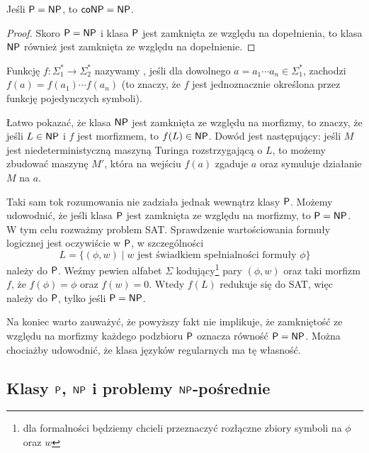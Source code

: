 \begin{theorem}
    Jeśli $\textsf{P} = \textsf{NP}$, to $\textsf{coNP} = \textsf{NP}$.
\end{theorem}
\begin{proof}
    Skoro $\textsf{P} = \textsf{NP}$ i klasa $\textsf{P}$ jest zamknięta ze względu na dopełnienia, to klasa $\textsf{NP}$ również jest zamknięta ze względu na dopełnienie.
\end{proof}

\begin{remark}
    Funkcję $f : \Sigma_1^* \to \Sigma_2^*$ nazywamy , jeśli dla dowolnego $a = a_1 \cdots a_n \in \Sigma_1^*$, zachodzi $f(a) = f(a_1) \cdots f(a_n)$ (to znaczy, że $f$ jest jednoznacznie określona przez funkcję pojedynczych symboli).

    Łatwo pokazać, że klasa $\textsf{NP}$ jest zamknięta ze względu na morfizmy, to znaczy, że jeśli $L \in \textsf{NP}$ i $f$ jest morfizmem, to $f(L) \in \textsf{NP}$. Dowód jest następujący: jeśli $M$ jest niedeterministyczną maszyną Turinga rozstrzygającą o $L$, to możemy zbudować maszynę $M'$, która na wejściu $f(a)$ zgaduje $a$ oraz symuluje działanie $M$ na $a$.

    Taki sam tok rozumowania nie zadziała jednak wewnątrz klasy $\textsf{P}$. Możemy udowodnić, że jeśli klasa $\textsf{P}$ jest zamknięta ze względu na morfizmy, to $\textsf{P} = \textsf{NP}$.
    W tym celu rozważmy problem SAT. Sprawdzenie wartościowania formuły logicznej jest oczywiście w $\textsf{P}$, w szczególności
    \[ L = \{(\phi, w) \mid w \text{ jest świadkiem spełnialności formuły } \phi \} \]
    należy do $\textsf{P}$. Weźmy pewien alfabet $\Sigma$ kodujący\footnote{dla formalności będziemy chcieli przeznaczyć rozłączne zbiory symboli na $\phi$ oraz $w$} pary $(\phi, w)$ oraz taki morfizm $f$, że $f(\phi) = \phi$ oraz $f(w) = 0$. Wtedy $f(L)$ redukuje się do SAT, więc należy do $\textsf{P}$, tylko jeśli $\textsf{P} = \textsf{NP}$.

    Na koniec warto zauważyć, że powyższy fakt nie implikuje, że zamkniętość ze względu na morfizmy każdego podzbioru $\textsf{P}$ oznacza równość $\textsf{P} = \textsf{NP}$. Można chociażby udowodnić, że klasa języków regularnych ma tę własność.
\end{remark}

\subsection{Klasy $\textsf{P}$, $\textsf{NP}$ i problemy $\textsf{NP}$-pośrednie}

